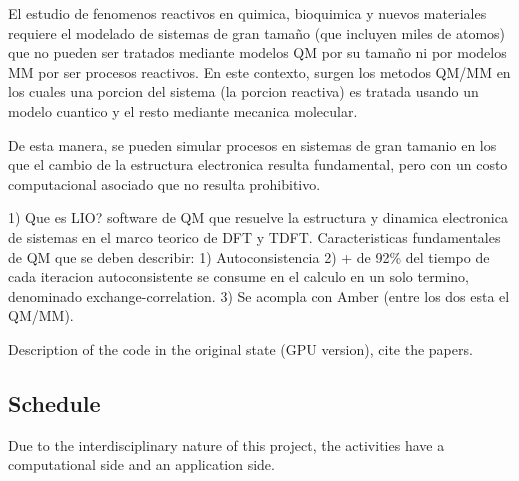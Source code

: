 \documentclass[a4paper,10pt]{article}
\begin{document}
El estudio de fenomenos reactivos en quimica, bioquimica y nuevos materiales requiere el modelado de sistemas de gran tama\~no (que incluyen miles de atomos) que no pueden ser tratados mediante modelos QM por su tama\~no ni por modelos MM por ser procesos reactivos.
En este contexto, surgen los metodos QM/MM en los cuales una porcion del sistema (la porcion reactiva) es tratada usando un modelo cuantico y el resto mediante mecanica molecular. 

De esta manera, se pueden simular procesos en sistemas de gran tamanio en los que el cambio de la estructura electronica resulta fundamental, pero con un costo computacional asociado que no resulta prohibitivo.

1) Que es LIO? software de QM que resuelve la estructura y dinamica electronica de sistemas en el marco teorico de DFT y TDFT.
Caracteristicas fundamentales de QM que se deben describir:
1) Autoconsistencia
2) + de 92\% del tiempo de cada iteracion autoconsistente se consume en el calculo en un solo termino, denominado exchange-correlation.
3) Se acompla con Amber (entre los dos esta el QM/MM).

Description of the code in the original state (GPU version), cite the papers. 









\subsection{Schedule} 

Due to the interdisciplinary nature of this project, the activities have a computational side and an application side.
\end{document}
